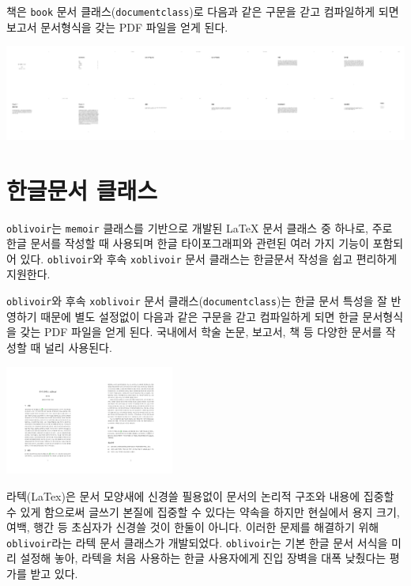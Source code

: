 \documentclass[
  letterpaper,
]{book}
\begin{document}
책은 \texttt{book} 문서 클래스(\texttt{documentclass})로 다음과 같은
구문을 갇고 컴파일하게 되면 보고서 문서형식을 갖는 PDF 파일을 얻게 된다.

\includegraphics[width=8.77in,height=\textheight]{document_class_files/figure-pdf/unnamed-chunk-4-1.png}

\hypertarget{uxd55cuxae00uxbb38uxc11c-uxd074uxb798uxc2a4}{%
\section{한글문서
클래스}\label{uxd55cuxae00uxbb38uxc11c-uxd074uxb798uxc2a4}}

\texttt{oblivoir}는 \texttt{memoir} 클래스를 기반으로 개발된 LaTeX 문서
클래스 중 하나로, 주로 한글 문서를 작성할 때 사용되며 한글
타이포그래피와 관련된 여러 가지 기능이 포함되어 있다.
\texttt{oblivoir}와 후속 \texttt{xoblivoir} 문서 클래스는 한글문서
작성을 쉽고 편리하게 지원한다.

\texttt{oblivoir}와 후속 \texttt{xoblivoir} 문서
클래스(\texttt{documentclass})는 한글 문서 특성을 잘 반영하기 때문에
별도 설정없이 다음과 같은 구문을 갇고 컴파일하게 되면 한글 문서형식을
갖는 PDF 파일을 얻게 된다. 국내에서 학술 논문, 보고서, 책 등 다양한
문서를 작성할 때 널리 사용된다. \autocite{2007oblivoir,Kim2011}

\includegraphics[width=2.19in,height=\textheight]{document_class_files/figure-pdf/unnamed-chunk-5-1.png}

라텍(LaTex)은 문서 모양새에 신경쓸 필용없이 문서의 논리적 구조와 내용에
집중할 수 있게 함으로써 글쓰기 본질에 집중할 수 있다는 약속을 하지만
현실에서 용지 크기, 여백, 행간 등 초심자가 신경쓸 것이 한둘이 아니다.
이러한 문제를 해결하기 위해 \texttt{oblivoir}라는 라텍 문서 클래스가
개발되었다. \texttt{oblivoir}는 기본 한글 문서 서식을 미리 설정해 놓아,
라텍을 처음 사용하는 한글 사용자에게 진입 장벽을 대폭 낮췄다는 평가를
받고 있다.
\end{document}
